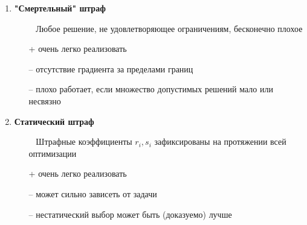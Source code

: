 \begin{enumerate}
    \item \textbf{"Смертельный" штраф}
    \begin{itemize}
        \item [~] Любое решение, не удовлетворяющее ограничениям, бесконечно плохое
        \item [+] очень легко реализовать
        \item [--] отсутствие градиента за пределами границ
        \item [--] плохо работает, если множество допустимых решений мало или несвязно
    \end{itemize}

    \item \textbf{Статический штраф}
    \begin{itemize}
        \item [~] Штрафные коэффициенты $r_i, s_i$ зафиксированы на протяжении всей оптимизации
        \item [+] очень легко реализовать
        \item [--] может сильно зависеть от задачи
        \item [--] нестатический выбор может быть (доказуемо) лучше
    \end{itemize}
\end{enumerate}

